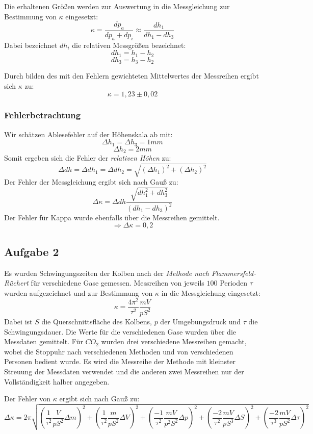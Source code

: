 \documentclass[%
   final,      %
   paper=a4, paper=portrait, pagesize=auto, %
   fontsize=11pt, %
   ngerman, %
 ]{scrartcl} %
\begin{document}
Die erhaltenen Größen werden zur Auswertung in die Messgleichung zur Bestimmung von $\kappa$ eingesetzt:
\begin{equation}
\kappa = \frac{dp_a}{dp_a + dp_i}\approx \frac{dh_1}{dh_1 - dh_3}
\end{equation}
Dabei bezeichnet $dh_i$ die relativen Messgrößen bezeichnet:
\[dh_1 = h_1 - h_2\]
\[dh_3 = h_3 - h_2\]

Durch bilden des mit den Fehlern gewichteten Mittelwertes der Messreihen ergibt sich $\kappa$ zu:
\begin{equation}
\kappa = 1,23 \pm 0,02
\end{equation}
\subsubsection{Fehlerbetrachtung}
Wir schätzen Ablesefehler auf der Höhenskala ab mit:
\[\Delta h_1 = \Delta h_3 = 1 mm\]
\[\Delta h_2 = 2mm\]
Somit ergeben sich die Fehler der \emph{relativen Höhen} zu:
\[\Delta dh = \Delta dh_1 = \Delta dh_2 = \sqrt{(\Delta h_1)^2 + (\Delta h_2)^2}\]
Der Fehler der Messgleichung ergibt sich nach Gauß zu:
\begin{equation}
\Delta\kappa = \Delta dh \frac{\sqrt{dh_1^2 + dh_3^2}}{(dh_1 -dh_3)^2}
\end{equation}
Der Fehler für Kappa wurde ebenfalls über die Messreihen gemittelt.
\[ \Longrightarrow\Delta \kappa = 0,2\]
\subsection{Aufgabe 2}
Es wurden Schwingungszeiten der Kolben nach der \emph{Methode nach Flammersfeld-Rüchert} für verschiedene Gase gemessen. Messreihen von jeweils $100$ Perioden $\tau$ wurden aufgezeichnet und zur Bestimmung von $\kappa$ in die Messgleichung eingesetzt:
\begin{equation}
\kappa = \frac{4\pi^2}{\tau^2}\frac{mV}{pS^2}
\end{equation}
Dabei ist $S$ die Querschnittsfläche des Kolbens, $p$ der Umgebungsdruck und $\tau$ die Schwingungsdauer.
Die Werte für die verschiedenen Gase wurden über die Messdaten gemittelt. Für $CO_2$ wurden drei verschiedene Messreihen gemacht, wobei die Stoppuhr nach verschiedenen Methoden und von verschiedenen Personen bedient wurde. Es wird die Messreihe der Methode mit kleinster Streuung der Messdaten verwendet und die anderen zwei Messreihen nur der Vollständigkeit halber angegeben.

Der Fehler von $\kappa$ ergibt sich nach Gauß zu:
\begin{equation}
\Delta \kappa = 2\pi\sqrt{
(\frac{1}{\tau^2}\frac{V}{pS^2}\Delta m)^2 + 
(\frac{1}{\tau^2}\frac{m}{pS^2}\Delta V)^2 + 
(\frac{-1}{\tau^2}\frac{mV}{p^2S^2}\Delta p)^2 + 
(\frac{-2}{\tau^2}\frac{mV}{pS^3}\Delta S)^2 + 
(\frac{-2}{\tau^3}\frac{mV}{pS^2}\Delta \tau)^2
}
\end{equation}
\end{document}
